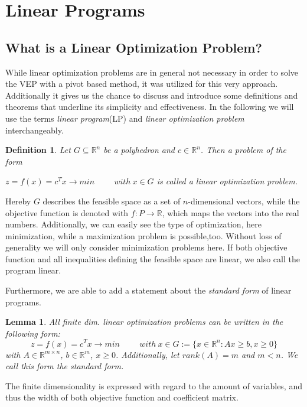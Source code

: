 \documentclass[a4paper, 11pt]{article}
\makeatletter
\newtheorem{mydef}{Definition}
\newtheorem{lemma}{Lemma}
\renewenvironment{quotation}
{\list{}{\listparindent=1.5em
		\itemindent=0pt
		\parsep\z@ \@plus\p@}%
	\item\relax}
{\endlist}
\makeatother
\begin{document}
\section{Linear Programs}
\subsection{What is a Linear Optimization Problem?}
While linear optimization problems are in general not necessary in order to solve the VEP with a pivot based method, it was utilized for this very approach. Additionally it gives us the chance to discuss and introduce some definitions and theorems that underline its simplicity and effectiveness. In the following we will use the terms \textit{linear program}(LP) and \textit{linear optimization problem} interchangeably.\medskip

\begin{mydef}
	Let $ G \subseteq \mathbb{R}^n$ be a polyhedron and $ c \in \mathbb{R}^n$. Then a problem of the form \medskip
	\vspace{0.15cm}
	\begin{quotation}
		$ z = f(x) = c^Tx \rightarrow min\hspace{1cm} with\ x \in G$
	\end{quotation} 
	is called a \emph{linear} optimization problem.
\end{mydef}

Hereby $G$ describes the feasible space as a set of $n$-dimensional vectors, while the objective function is denoted with $f:P\rightarrow\mathbb{R}$, which maps the vectors into the real numbers. Additionally, we can easily see the type of optimization, here minimization, while a maximization problem is possible,too. Without loss of generality we will only consider minimization problems here. If both objective function and all inequalities defining the feasible space are linear, we also call the program linear. \medskip

Furthermore, we are able to add a statement about the \textit{standard form} of linear programs. \medskip
\begin{lemma}\cite{introtoAlg}
	All finite dim. linear optimization problems can be written in the following form:\medskip
	\begin{equation}
		\label{standardform}
		z = f(x) = c^T x \rightarrow min \hspace{1cm} with\ x \in G:=\{x \in \mathbb{R}^n: Ax \geq b, x \geq 0\}
	\end{equation}
	with $A\in \mathbb{R}^{m\times n}$, $b\in\mathbb{R}^m$, $x\geq 0$. Additionally, let $rank(A)=m$ and $m< n$.\medskip
	We call this form the \textit{standard form}.
\end{lemma}
The finite dimensionality is expressed with regard to the amount of variables, and thus the width of both objective function and coefficient matrix. \medskip
\end{document}
